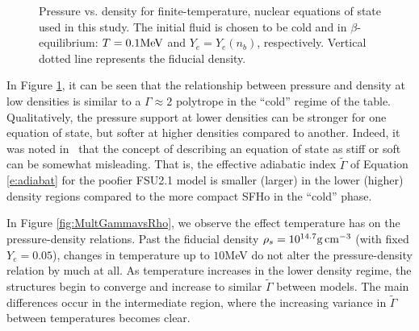 \begin{figure}
	\centering
	
	\caption[Pressure vs. density for a cold, beta-equilibrium slice]{
		Pressure vs. density for finite-temperature, nuclear equations of state used in this study. The initial fluid is chosen to be cold and in $\beta$-equilibrium: $T=0.1 {\rm MeV}$ and $Y_e = Y_e (n_b)$, respectively.  Vertical dotted line represents the fiducial density.
	}
	\label{fig:PvsRho}
\end{figure}

In Figure \ref{fig:PvsRho}, it can be seen that the relationship between pressure and density at low densities is similar to a $\Gamma \approx 2$ polytrope in the ``cold'' regime of the table.  
Qualitatively, the pressure support at lower densities can be stronger for one equation of state, but softer at higher densities compared to another.  
Indeed, it was noted in~\cite{steiner2013core} that the concept of describing an equation of state as stiff or soft can be somewhat misleading.  
That is, the effective adiabatic index $\tilde{\Gamma}$ of Equation \ref{e:adiabat} for the poofier FSU2.1 model is smaller (larger) in the lower (higher) density regions compared to the more compact SFHo in the ``cold'' phase.

%	


%	


In Figure \ref{fig:MultGammavsRho}, we observe the effect temperature has on the pressure-density relations.  Past the fiducial density $\rho_s = 10^{14.7} {\rm g \, cm^{-3}}$ (with fixed $Y_e = 0.05$), changes in temperature up to $10$MeV do not alter the pressure-density relation by much at all.  As temperature increases in the lower density regime, the structures begin to converge and increase to similar $\tilde{\Gamma}$ between models.  The main differences occur in the intermediate region, where the increasing variance in $\tilde{\Gamma}$ between temperatures becomes clear.


